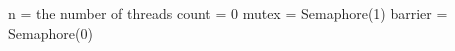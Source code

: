 \documentclass[varwidth=13.5em,crop]{standalone}
\begin{document}
\begin{pythoncode}
n = the number of threads
count = 0
mutex = Semaphore(1)
barrier = Semaphore(0)
\end{pythoncode}
\end{document}
